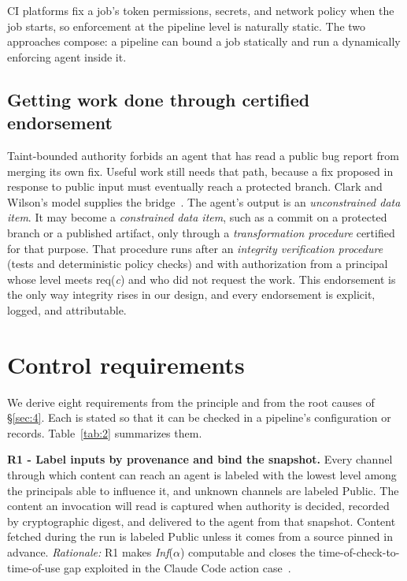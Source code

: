 \documentclass[acmsmall,screen,review]{acmart}
\begin{document}
CI platforms fix a job's token permissions, secrets, and network policy when the job starts, so enforcement at the pipeline level is naturally static. The two approaches compose: a pipeline can bound a job statically and run a dynamically enforcing agent inside it.


\subsection{Getting work done through certified endorsement}\label{sec:5.5}

Taint-bounded authority forbids an agent that has read a public bug report from merging its own fix. Useful work still needs that path, because a fix proposed in response to public input must eventually reach a protected branch. Clark and Wilson's model supplies the bridge~\cite{clark1987comparison}. The agent's output is an \emph{unconstrained data item}. It may become a \emph{constrained data item}, such as a commit on a protected branch or a published artifact, only through a \emph{transformation procedure} certified for that purpose. That procedure runs after an \emph{integrity verification procedure} (tests and deterministic policy checks) and with authorization from a principal whose level meets req(\emph{c}) and who did not request the work. This endorsement is the only way integrity rises in our design, and every endorsement is explicit, logged, and attributable.


\section{Control requirements}\label{sec:6}

We derive eight requirements from the principle and from the root causes of \S\ref{sec:4}. Each is stated so that it can be checked in a pipeline's configuration or records. Table~\ref{tab:2} summarizes them.

\textbf{R1 - Label inputs by provenance and bind the snapshot.} Every channel through which content can reach an agent is labeled with the lowest level among the principals able to influence it, and unknown channels are labeled Public. The content an invocation will read is captured when authority is decided, recorded by cryptographic digest, and delivered to the agent from that snapshot. Content fetched during the run is labeled Public unless it comes from a source pinned in advance. \emph{Rationale:} R1 makes \emph{Inf}($\alpha$) computable and closes the time-of-check-to-time-of-use gap exploited in the Claude Code action case~\cite{stawinski2026trusting}.
\end{document}
